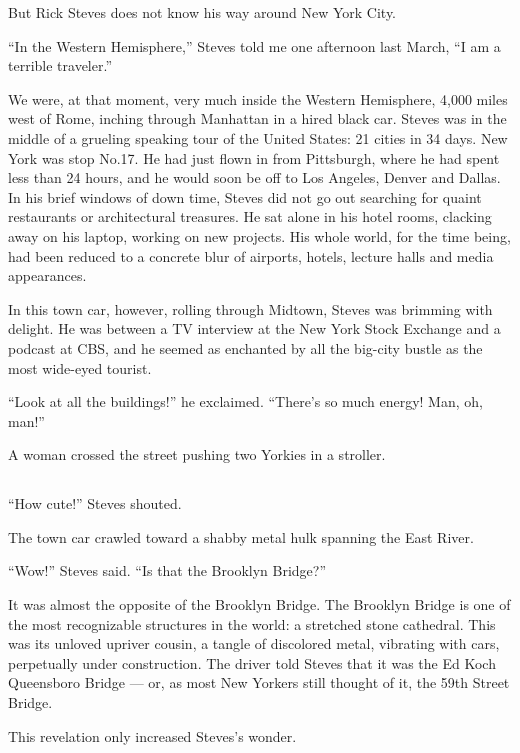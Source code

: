 But Rick Steves does not know his way around New York City.

``In the Western Hemisphere,'' Steves told me one afternoon last March,
``I am a terrible traveler.''

We were, at that moment, very much inside the Western Hemisphere, 4,000
miles west of Rome, inching through Manhattan in a hired black car.
Steves was in the middle of a grueling speaking tour of the United
States: 21 cities in 34 days. New York was stop No.17. He had just flown
in from Pittsburgh, where he had spent less than 24 hours, and he would
soon be off to Los Angeles, Denver and Dallas. In his brief windows of
down time, Steves did not go out searching for quaint restaurants or
architectural treasures. He sat alone in his hotel rooms, clacking away
on his laptop, working on new projects. His whole world, for the time
being, had been reduced to a concrete blur of airports, hotels, lecture
halls and media appearances.

In this town car, however, rolling through Midtown, Steves was brimming
with delight. He was between a TV interview at the New York Stock
Exchange and a podcast at CBS, and he seemed as enchanted by all the
big-city bustle as the most wide-eyed tourist.

``Look at all the buildings!'' he exclaimed. ``There's so much energy!
Man, oh, man!''

A woman crossed the street pushing two Yorkies in a stroller.

\hypertarget{-4}{%
\subsection{}\label{-4}}

``How cute!'' Steves shouted.

The town car crawled toward a shabby metal hulk spanning the East River.

``Wow!'' Steves said. ``Is that the Brooklyn Bridge?''

It was almost the opposite of the Brooklyn Bridge. The Brooklyn Bridge
is one of the most recognizable structures in the world: a stretched
stone cathedral. This was its unloved upriver cousin, a tangle of
discolored metal, vibrating with cars, perpetually under construction.
The driver told Steves that it was the Ed Koch Queensboro Bridge --- or,
as most New Yorkers still thought of it, the 59th Street Bridge.

This revelation only increased Steves's wonder.

